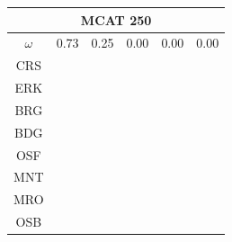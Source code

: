 \documentclass[12pt]{article}
\begin{document}
\begin{landscape}
\begin{figure}
\vspace*{-2.1cm}
\hspace*{5cm}
\begin{minipage}[c]{0.3\textwidth}
\hspace*{-5cm}
\begin{tabular}{|c|c|c|c|c|c|}%
         \hline \multicolumn{6}{|c|}{MCAT 250} \\ \hline
         $\omega$&0.73&0.25&0.00&0.00&0.00\\ \hline %
        CRS&\cellcolor[HTML]{E41A1C}&\cellcolor[HTML]{E41A1C}&\cellcolor[HTML]{E41A1C}&\cellcolor[HTML]{E41A1C}&\cellcolor[HTML]{E41A1C}\\ \hline %
        ERK&\cellcolor[HTML]{377EB8}&\cellcolor[HTML]{E41A1C}&\cellcolor[HTML]{E41A1C}&\cellcolor[HTML]{377EB8}&\cellcolor[HTML]{E41A1C}\\ \hline %
        BRG&\cellcolor[HTML]{377EB8}&\cellcolor[HTML]{E41A1C}&\cellcolor[HTML]{E41A1C}&\cellcolor[HTML]{377EB8}&\cellcolor[HTML]{E41A1C}\\ \hline %
        BDG&\cellcolor[HTML]{4DAF4A}&\cellcolor[HTML]{377EB8}&\cellcolor[HTML]{377EB8}&\cellcolor[HTML]{377EB8}&\cellcolor[HTML]{377EB8}\\ \hline %
        OSF&\cellcolor[HTML]{4DAF4A}&\cellcolor[HTML]{377EB8}&\cellcolor[HTML]{377EB8}&\cellcolor[HTML]{4DAF4A}&\cellcolor[HTML]{377EB8}\\ \hline %
        MNT&\cellcolor[HTML]{4DAF4A}&\cellcolor[HTML]{377EB8}&\cellcolor[HTML]{377EB8}&\cellcolor[HTML]{4DAF4A}&\cellcolor[HTML]{4DAF4A}\\ \hline %
        MRO&\cellcolor[HTML]{984EA3}&\cellcolor[HTML]{4DAF4A}&\cellcolor[HTML]{4DAF4A}&\cellcolor[HTML]{984EA3}&\cellcolor[HTML]{984EA3}\\ \hline %
        OSB&\cellcolor[HTML]{984EA3}&\cellcolor[HTML]{4DAF4A}&\cellcolor[HTML]{4DAF4A}&\cellcolor[HTML]{984EA3}&\cellcolor[HTML]{984EA3}\\ \hline %

\end{tabular}
\end{minipage}
\end{figure}
\end{landscape}
\end{document}
